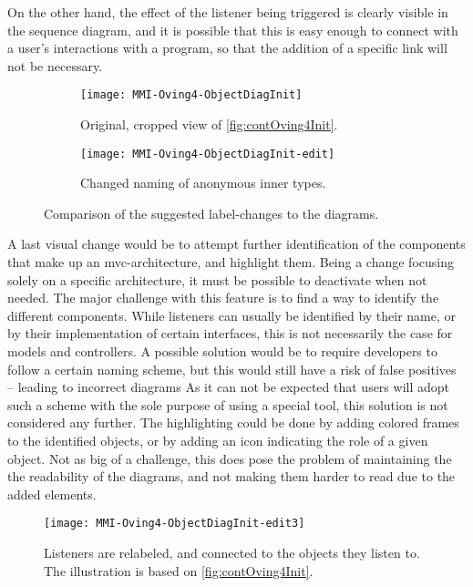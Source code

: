 On the other hand, the effect of the listener being triggered is clearly visible in the sequence diagram, and it is possible that this is easy enough to connect with a user's interactions with a program, so that the addition of a specific link will not be necessary.

\begin{figure}[H]
	\centering
	\begin{subfigure}{\textwidth}
		\centering
		\texttt{[image: MMI-Oving4-ObjectDiagInit]}
		\caption{Original, cropped view of \cref{fig:contOving4Init}.}
		\label{fig:contOving4ChangesLabA}
	\end{subfigure}
	\begin{subfigure}{\textwidth}
		\centering
		\texttt{[image: MMI-Oving4-ObjectDiagInit-edit]}
		\caption{Changed naming of anonymous inner types.}
		\label{fig:contOving4ChangesLabB}
	\end{subfigure}
	\caption{Comparison of the suggested label-changes to the diagrams.}
	\label{fig:contOving4ChangesLab}
\end{figure}

A last visual change would be to attempt further identification of the components that make up an \gls{mvc}-architecture, and highlight them.
Being a change focusing solely on a specific architecture, it must be possible to deactivate when not needed.
The major challenge with this feature is to find a way to identify the different components.
While listeners can usually be identified by their name, or by their implementation of certain interfaces, this is not necessarily the case for models and controllers.
A possible solution would be to require developers to follow a certain naming scheme, but this would still have a risk of false positives -- leading to incorrect diagrams
As it can not be expected that users will adopt such a scheme with the sole purpose of using a special tool, this solution is not considered any further.
The highlighting could be done by adding colored frames to the identified objects, or by adding an icon indicating the role of a given object.
Not as big of a challenge, this does pose the problem of maintaining the the readability of the diagrams, and not making them harder to read due to the added elements.


\begin{figure}[H]
	\centering
	\texttt{[image: MMI-Oving4-ObjectDiagInit-edit3]}
	\caption{Listeners are relabeled, and connected to the objects they listen to. The illustration is based on \cref{fig:contOving4Init}.}
	\label{fig:contOving4ChangesLink}
\end{figure}



